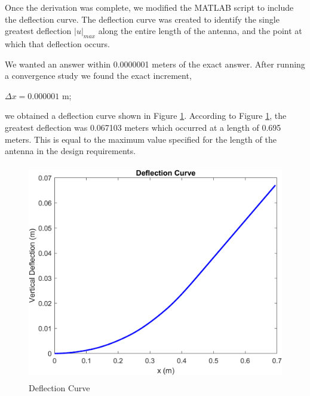 \documentclass[12pt]{article}
\begin{document}
Once the derivation was complete, we modified the MATLAB script to include the deflection curve. The deflection curve was created to identify the single greatest deflection $|u|_{max}$ along the entire length of the antenna, and the point at which that deflection occurs. 

We wanted an answer within 0.0000001 meters of the exact answer. After running a convergence study we found the exact increment, \\

\centerline{$\Delta{x} = 0.000001$ m;}

we obtained a deflection curve shown in Figure \ref{DeflectionCurve}. According to Figure \ref{DeflectionCurve}, the greatest deflection was 0.067103 meters which occurred at a length of 0.695 meters. This is equal to the maximum value specified for the length of the antenna in the design requirements.

\begin{figure}[H]
\centering
\includegraphics[height= 9.5cm, width= 12.5cm]{curve_Deflection_Curve.png}
\caption{Deflection Curve}
\label{DeflectionCurve}
\end{figure}
\newpage
\end{document}
